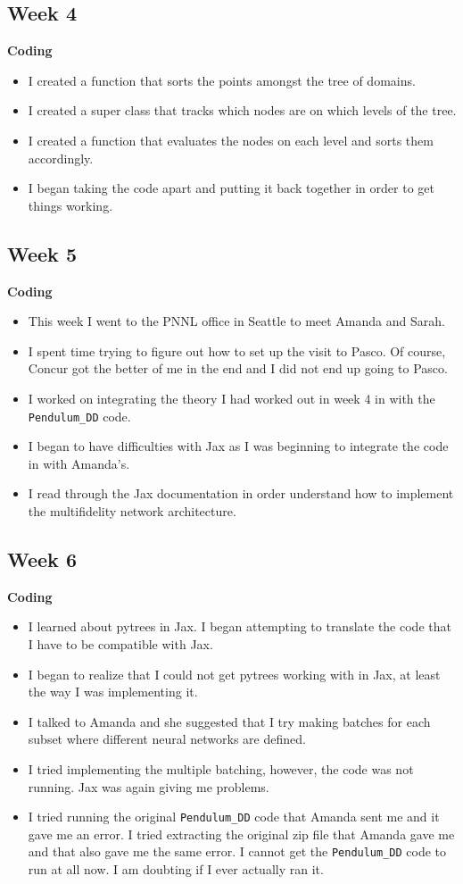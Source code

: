 \documentclass{article}
\def\bf{\textbf}
\begin{document}
\subsection*{Week 4}
\bf{Coding}
\begin{itemize}
\item I created a function that sorts the points amongst the tree of domains.
\item I created a super class that tracks which nodes are on which levels of the tree.
\item I created a function that evaluates the nodes on each level and sorts them accordingly.
\item I began taking the code apart and putting it back together in order to get things working.
\end{itemize}
\subsection*{Week 5} 
\bf{Coding}
\begin{itemize}
\item This week I went to the PNNL office in Seattle to meet  Amanda and Sarah.
\item I spent time trying to figure out how to set up the visit to Pasco. Of course, Concur got the better of me in the end and I did not end up going to Pasco.
\item I worked on integrating the theory I had worked out in week 4 in with the \verb|Pendulum_DD| code.
\item I began to have difficulties with Jax as I was beginning to integrate the code in with Amanda's.
\item I read through the Jax documentation in order understand how to implement the multifidelity network architecture.
\end{itemize}
\subsection*{Week 6}
\textbf{Coding}
\begin{itemize}
\item I learned about pytrees in Jax. I began attempting to translate the code that I have to be compatible with Jax.
\item I began to realize that I could not get pytrees working with in Jax, at least the way I was implementing it.
\item I talked to Amanda and she suggested that I try making batches for each subset where different neural networks are defined.
\item I tried implementing the multiple batching, however, the code was not running. Jax was again giving me problems.
\item I tried running the original \verb|Pendulum_DD| code that Amanda sent me and it gave me an error. I tried extracting the original zip file that Amanda gave me and that also gave me the same error. I cannot get the \verb|Pendulum_DD| code to run at all now. I am doubting if I ever actually ran it.
\end{itemize}
\newpage
\end{document}
